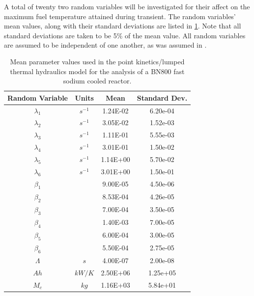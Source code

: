 A total of twenty two random variables will be investigated for their affect on the maximum fuel temperature attained during transient. The random variables' mean values, along with their standard deviations are listed in \ref{table:pkinetics_parameters}. Note that all standard deviations are taken to be 5\% of the mean value. All random variables are assumed to be independent of one another, as was assumed in \cite{Gilli_mc2011}. 
\begin{table} 
\caption[Parameter values used in a point kinetics/lumped thermal hydraulics model of a BN800 fast sodium cooled reactor.]{\label{table:pkinetics_parameters} 
Mean parameter values used in the point kinetics/lumped thermal hydraulics model for the analysis of a BN800 fast sodium cooled reactor.}
\centering
\begin{tabular}{||c|c|c|c||} 
\hline \hline
\textbf{Random Variable} & \textbf{Units} & \textbf{Mean} & \textbf{Standard Dev.} \\ \hline
$\lambda_1$  &  $s^{-1}$      &  1.24E-02  &  6.20e-04  \\ \hline
$\lambda_2$  &  $s^{-1}$      &  3.05E-02  &  1.52e-03  \\ \hline
$\lambda_3$  &  $s^{-1}$      &  1.11E-01  &  5.55e-03  \\ \hline
$\lambda_4$  &  $s^{-1}$      &  3.01E-01  &  1.50e-02  \\ \hline
$\lambda_5$  &  $s^{-1}$      &  1.14E+00  &  5.70e-02  \\ \hline
$\lambda_6$  &  $s^{-1}$      &  3.01E+00  &  1.50e-01  \\ \hline
$\beta_1$    &                &  9.00E-05  &  4.50e-06  \\ \hline
$\beta_2$    &                &  8.53E-04  &  4.26e-05  \\ \hline
$\beta_3$    &                &  7.00E-04  &  3.50e-05  \\ \hline
$\beta_4$    &                &  1.40E-03  &  7.00e-05  \\ \hline
$\beta_5$    &                &  6.00E-04  &  3.00e-05  \\ \hline
$\beta_6$    &                &  5.50E-04  &  2.75e-05  \\ \hline
$\Lambda$    &  $s$           &  4.00E-07  &  2.00e-08  \\ \hline
$Ah$         &  $kW/K$        &  2.50E+06  &  1.25e+05  \\ \hline
$M_c$        &  $kg$          &  1.16E+03  &  5.84e+01  \\ \hline

\end{tabular}
\end{table}
